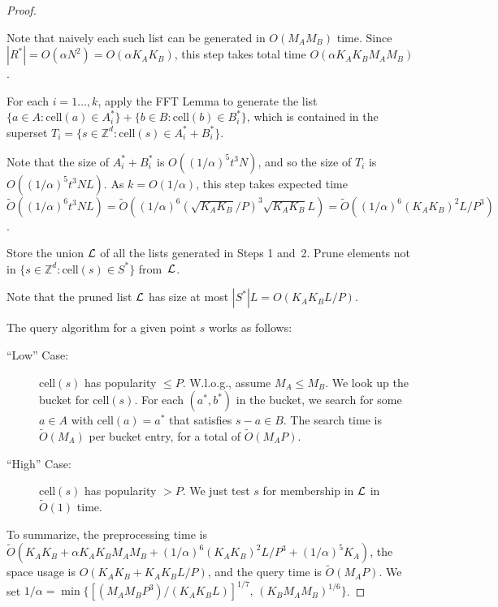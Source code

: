 \documentclass[11pt]{article}
\newcommand{\Z}{\mathbb{Z}}
\newcommand{\OO}{\widetilde{O}}
\newcommand{\CELL}{\textrm{cell}}
\begin{document}
{\begin{proof}
\begin{description}
Note that naively each such list can
be generated in $O(M_AM_B)$ time.
Since $|R^*|=O(\alpha N^2)=O(\alpha K_AK_B)$, this step takes total
time $O(\alpha K_AK_BM_AM_B)$.

\item[Step 2:]
For each $i=1\ldots,k$, apply the FFT Lemma to generate the list
$\{a\in A: \CELL(a)\in A_i^*\} + \{b\in B: \CELL(b)\in B_i^*\}$,
which is contained in the
superset $T_i = \{s\in \Z^d: \CELL(s)\in A_i^*+B_i^*\}$.

Note that the size of $A_i^*+B_i^*$ is $O((1/\alpha)^5 t^3 N)$,
and so the size of $T_i$ is $O((1/\alpha)^5 t^3 N L)$.
As $k=O(1/\alpha)$, this step takes expected time
$\OO((1/\alpha)^6 t^3 NL)
= \OO((1/\alpha)^6 (\sqrt{K_AK_B}/P)^3 \sqrt{K_AK_B} L)
= \OO((1/\alpha)^6 (K_AK_B)^2L/P^3)$.
\item[Step 3:]
Store the union ${\cal L}$ of all the lists generated in Steps
1 and~2.
Prune elements not in $\{s\in\Z^d: \CELL(s)\in S^*\}$ from~${\cal L}$.

Note that the pruned list ${\cal L}$ has size at most
$|S^*| L = O(K_AK_B L/P)$.
\end{description}

The query algorithm for a given point $s$ works as follows:
\begin{description}
\item[``Low'' Case:] $\CELL(s)$ has popularity $\le P$.
W.l.o.g., assume $M_A\le M_B$.
We look up the bucket for $\CELL(s)$.  For each $(a^*,b^*)$
in the bucket, we search for some $a\in A$ with $\CELL(a)=a^*$
that satisfies $s-a\in B$.  The search time is $\OO(M_A)$ per bucket entry, for a total of $\OO(M_AP)$.
\item[``High'' Case:] $\CELL(s)$ has popularity $>P$.  We just test $s$ for membership in ${\cal L}$ in
$\OO(1)$ time.
\end{description}

To summarize, the preprocessing time is
$\OO(K_AK_B + \alpha K_AK_BM_AM_B + (1/\alpha)^6 (K_AK_B)^2L/P^3
 + (1/\alpha)^5 K_A)$,
the space usage is $O(K_AK_B + K_AK_BL/P)$,
and the query time is $\OO(M_AP)$.
We set $1/\alpha = \min\{[(M_AM_BP^3)/(K_AK_B L)]^{1/7},\,
  (K_BM_AM_B)^{1/6}\}$.
\end{proof}


}
\end{document}
